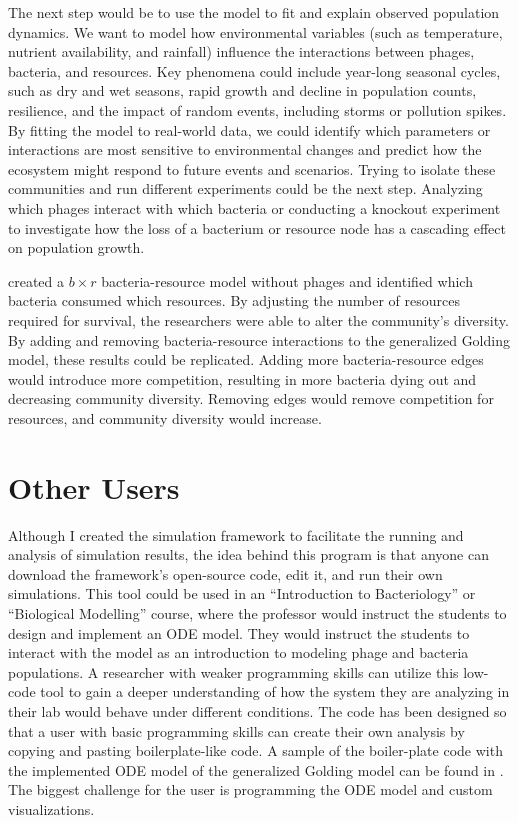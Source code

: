 The next step would be to use the model to fit and explain observed population dynamics. 
We want to model how environmental variables (such as temperature, nutrient availability, and rainfall) influence the interactions between phages, bacteria, and resources. 
Key phenomena could include year-long seasonal cycles, such as dry and wet seasons, rapid growth and decline in population counts, resilience, and the impact of random events, including storms or pollution spikes. 
By fitting the model to real-world data, we could identify which parameters or interactions are most sensitive to environmental changes and predict how the ecosystem might respond to future events and scenarios. 
Trying to isolate these communities and run different experiments could be the next step. 
Analyzing which phages interact with which bacteria or conducting a knockout experiment to investigate how the loss of a bacterium or resource node has a cascading effect on population growth. 

\citet{cleggCrossfeedingCreatesTipping2025} created a $b\times r$ bacteria-resource model without phages and identified which bacteria consumed which resources. 
By adjusting the number of resources required for survival, the researchers were able to alter the community's diversity. 
By adding and removing bacteria-resource interactions to the generalized Golding model, these results could be replicated. 
Adding more bacteria-resource edges would introduce more competition, resulting in more bacteria dying out and decreasing community diversity. 
Removing edges would remove competition for resources, and community diversity would increase. 

\section{Other Users}
Although I created the simulation framework to facilitate the running and analysis of simulation results, the idea behind this program is that anyone can download the framework's open-source code, edit it, and run their own simulations. 
This tool could be used in an “Introduction to Bacteriology” or “Biological Modelling” course, where the professor would instruct the students to design and implement an ODE model. 
They would instruct the students to interact with the model as an introduction to modeling phage and bacteria populations. 
A researcher with weaker programming skills can utilize this low-code tool to gain a deeper understanding of how the system they are analyzing in their lab would behave under different conditions. 
The code has been designed so that a user with basic programming skills can create their own analysis by copying and pasting boilerplate-like code. 
A sample of the boiler-plate code with the implemented ODE model of the generalized Golding model can be found in . 
The biggest challenge for the user is programming the ODE model and custom visualizations. 

